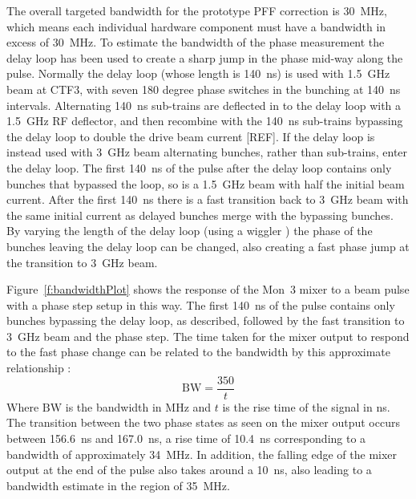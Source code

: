 The overall targeted bandwidth for the prototype PFF correction is 30~MHz, which means each individual hardware component must have a bandwidth in excess of 30~MHz. To estimate the bandwidth of the phase measurement the delay loop has been used to create a sharp jump in the phase mid-way along the pulse. Normally the delay loop (whose length is 140~ns) is used with 1.5~GHz beam at CTF3, with seven 180 degree phase switches in the bunching at 140~ns intervals. Alternating 140~ns sub-trains are deflected in to the delay loop with a 1.5~GHz RF deflector, and then recombine with the 140~ns sub-trains bypassing the delay loop to double the drive beam current [REF]. If the delay loop is instead used with 3~GHz beam alternating bunches, rather than sub-trains, enter the delay loop. The first 140~ns of the pulse after the delay loop contains only bunches that bypassed the loop, so is a 1.5~GHz beam with half the initial beam current. After the first 140~ns there is a fast transition back to 3~GHz beam with the same initial current as delayed bunches merge with the bypassing bunches. By varying the length of the delay loop (using a wiggler \cite{wiggler}) the phase of the bunches leaving the delay loop can be changed, also creating a fast phase jump at the transition to 3~GHz beam.

Figure~\ref{f:bandwidthPlot} shows the response of the Mon~3 mixer to a beam pulse with a phase step setup in this way. The first 140~ns of the pulse contains only bunches bypassing the delay loop, as described, followed by the fast transition to 3~GHz beam and the phase step. The time taken for the mixer output to respond to the fast phase change can be related to the bandwidth by this approximate relationship \cite{bwRisTim}:
\begin{equation}
\mathrm{BW} = \frac{350}{t}
\end{equation}
Where \(\mathrm{BW}\) is the bandwidth in MHz and \(t\) is the rise time of the signal in ns. The transition between the two phase states as seen on the mixer output occurs between 156.6~ns and 167.0~ns, a rise time of 10.4~ns corresponding to a bandwidth of approximately 34~MHz. In addition, the falling edge of the mixer output at the end of the pulse also takes around a 10~ns, also leading to a bandwidth estimate in the region of 35~MHz.

